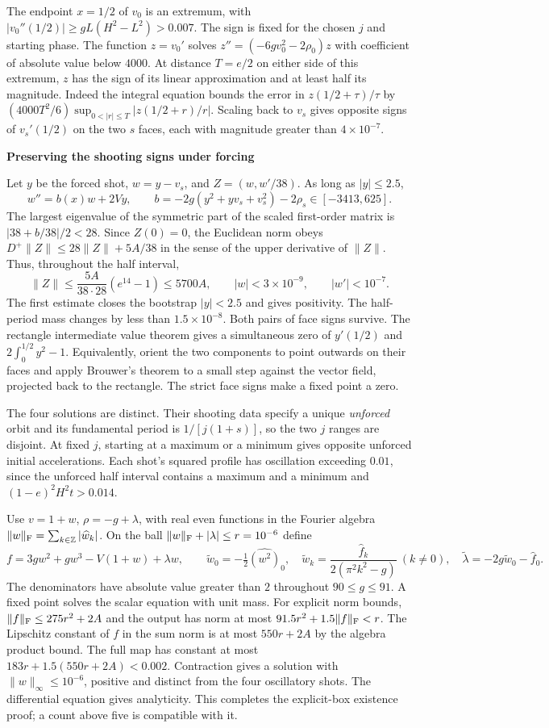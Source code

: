 \documentclass[11pt]{article}
\newcommand{\titleline}[1]{{\Large\bfseries\sffamily\color{ink}#1}\par}
\newcommand{\topic}[1]{\smallskip{\bfseries\sffamily\color{accent}#1}\par\nobreak}
\newcommand{\norm}[1]{\lVert #1\rVert}
\begin{document}
The endpoint $x=1/2$ of $v_0$ is an extremum, with
$|v_0''(1/2)|\ge g L(H^2-L^2)>0.007$. The sign is fixed for the chosen $j$ and starting phase. The function $z=v_0'$ solves $z''=(-6gv_0^2-2\rho_0)z$ with coefficient of absolute value below $4000$. At distance $T=e/2$ on either side of this extremum, $z$ has the sign of its linear approximation and at least half its magnitude. Indeed the integral equation bounds the error in $z(1/2+\tau)/\tau$ by $(4000T^2/6)\sup_{0<|r|\le T}|z(1/2+r)/r|$. Scaling back to $v_s$ gives opposite signs of $v_s'(1/2)$ on the two $s$ faces, each with magnitude greater than $4\times10^{-7}$.

\newpage
\titleline{Preserving the shooting signs under forcing}
Let $y$ be the forced shot, $w=y-v_s$, and $Z=(w,w'/38)$. As long as $|y|\le2.5$,
\[
w''=b(x)w+2Vy,\qquad b=-2g(y^2+yv_s+v_s^2)-2\rho_s\in[-3413,625].
\]
The largest eigenvalue of the symmetric part of the scaled first-order matrix is $|38+b/38|/2<28$. Since $Z(0)=0$, the Euclidean norm obeys $D^+\norm Z\le28\norm Z+5A/38$ in the sense of the upper derivative of $\norm Z$. Thus, throughout the half interval,
\[
\norm Z\le \frac{5A}{38\cdot28}(e^{14}-1)\le5700A,
\qquad |w|<3\times10^{-9},\qquad |w'|<10^{-7}.
\]
The first estimate closes the bootstrap $|y|<2.5$ and gives positivity. The half-period mass changes by less than $1.5\times10^{-8}$. Both pairs of face signs survive. The rectangle intermediate value theorem gives a simultaneous zero of $y'(1/2)$ and $2\int_0^{1/2}y^2-1$. Equivalently, orient the two components to point outwards on their faces and apply Brouwer's theorem to a small step against the vector field, projected back to the rectangle. The strict face signs make a fixed point a zero.

The four solutions are distinct. Their shooting data specify a unique \emph{unforced} orbit and its fundamental period is $1/[j(1+s)]$, so the two $j$ ranges are disjoint. At fixed $j$, starting at a maximum or a minimum gives opposite unforced initial accelerations. Each shot's squared profile has oscillation exceeding $0.01$, since the unforced half interval contains a maximum and a minimum and $(1-e)^2H^2t>0.014$.

\topic{The fifth solution}
Use $v=1+w$, $\rho=-g+\lambda$, with real even functions in the Fourier algebra $\norm w_{\rm F}=\sum_{k\in\mathbb Z}|\widehat w_k|$. On the ball $\norm w_{\rm F}+|\lambda|\le r=10^{-6}$ define
\[
 f=3gw^2+gw^3-V(1+w)+\lambda w,\qquad
 \widetilde w_0=-\tfrac12\widehat{(w^2)}_0,\quad
 \widetilde w_k=\frac{\widehat f_k}{2(\pi^2 k^2-g)}\ (k\ne0),\quad
 \widetilde\lambda=-2g\widetilde w_0-\widehat f_0 .
\]
The denominators have absolute value greater than $2$ throughout $90\le g\le91$. A fixed point solves the scalar equation with unit mass. For explicit norm bounds, $\norm f_{\rm F}\le275r^2+2A$ and the output has norm at most $91.5r^2+1.5\norm f_{\rm F}<r$. The Lipschitz constant of $f$ in the sum norm is at most $550r+2A$ by the algebra product bound. The full map has constant at most $183r+1.5(550r+2A)<0.002$. Contraction gives a solution with $\norm w_\infty\le10^{-6}$, positive and distinct from the four oscillatory shots. The differential equation gives analyticity. This completes the explicit-box existence proof; a count above five is compatible with it.
\end{document}
